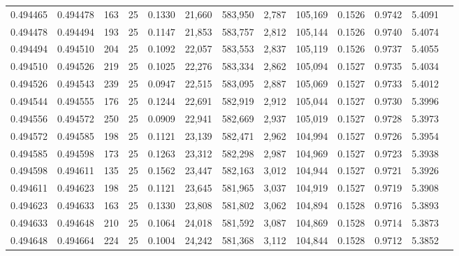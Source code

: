 \begin{tabular}{rrrrrrrrrrrrr}
0.494465 & 0.494478 & 163 &  25 &                                     0.1330 &  21,660 & 583,950 &   2,787 & 105,169 & 0.1526 & 0.9742 & 5.4091 \\
0.494478 & 0.494494 & 193 &  25 &                                     0.1147 &  21,853 & 583,757 &   2,812 & 105,144 & 0.1526 & 0.9740 & 5.4074 \\
0.494494 & 0.494510 & 204 &  25 &                                     0.1092 &  22,057 & 583,553 &   2,837 & 105,119 & 0.1526 & 0.9737 & 5.4055 \\
0.494510 & 0.494526 & 219 &  25 &                                     0.1025 &  22,276 & 583,334 &   2,862 & 105,094 & 0.1527 & 0.9735 & 5.4034 \\
0.494526 & 0.494543 & 239 &  25 &                                     0.0947 &  22,515 & 583,095 &   2,887 & 105,069 & 0.1527 & 0.9733 & 5.4012 \\
0.494544 & 0.494555 & 176 &  25 &                                     0.1244 &  22,691 & 582,919 &   2,912 & 105,044 & 0.1527 & 0.9730 & 5.3996 \\
0.494556 & 0.494572 & 250 &  25 &                                     0.0909 &  22,941 & 582,669 &   2,937 & 105,019 & 0.1527 & 0.9728 & 5.3973 \\
0.494572 & 0.494585 & 198 &  25 &                                     0.1121 &  23,139 & 582,471 &   2,962 & 104,994 & 0.1527 & 0.9726 & 5.3954 \\
0.494585 & 0.494598 & 173 &  25 &                                     0.1263 &  23,312 & 582,298 &   2,987 & 104,969 & 0.1527 & 0.9723 & 5.3938 \\
0.494598 & 0.494611 & 135 &  25 &                                     0.1562 &  23,447 & 582,163 &   3,012 & 104,944 & 0.1527 & 0.9721 & 5.3926 \\
0.494611 & 0.494623 & 198 &  25 &                                     0.1121 &  23,645 & 581,965 &   3,037 & 104,919 & 0.1527 & 0.9719 & 5.3908 \\
0.494623 & 0.494633 & 163 &  25 &                                     0.1330 &  23,808 & 581,802 &   3,062 & 104,894 & 0.1528 & 0.9716 & 5.3893 \\
0.494633 & 0.494648 & 210 &  25 &                                     0.1064 &  24,018 & 581,592 &   3,087 & 104,869 & 0.1528 & 0.9714 & 5.3873 \\
0.494648 & 0.494664 & 224 &  25 &                                     0.1004 &  24,242 & 581,368 &   3,112 & 104,844 & 0.1528 & 0.9712 & 5.3852 \\

\end{tabular}
